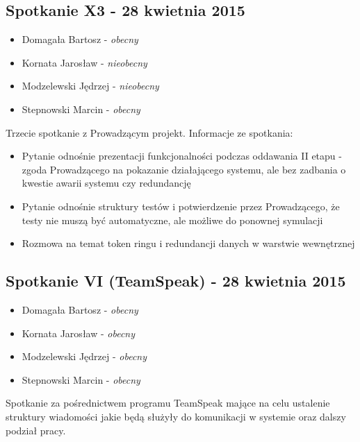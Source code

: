 \subsection[Spotkanie X3 - 28 kwietnia 2015]{Spotkanie X3 - 28 kwietnia 2015}

\begin{itemize}
\item Domagała Bartosz - \textit{obecny}
\item Kornata Jarosław - \textit{nieobecny}
\item Modzelewski Jędrzej - \textit{nieobecny}
\item Stepnowski Marcin - \textit{obecny}
\end{itemize}

\par{Trzecie spotkanie z Prowadzącym projekt. Informacje ze spotkania:}

\begin{itemize}
\item Pytanie odnośnie prezentacji funkcjonalności podczas oddawania II etapu - zgoda Prowadzącego na pokazanie działającego systemu, ale bez zadbania o kwestie awarii systemu czy redundancję
\item Pytanie odnośnie struktury testów i potwierdzenie przez Prowadzącego, że testy nie muszą być automatyczne, ale możliwe do ponownej symulacji
\item Rozmowa na temat token ringu i redundancji danych w warstwie wewnętrznej

\end{itemize}

\subsection[Spotkanie VI (TeamSpeak)- 28 kwietnia 2015]{Spotkanie VI (TeamSpeak) - 28 kwietnia 2015}

\begin{itemize}
\item Domagała Bartosz - \textit{obecny}
\item Kornata Jarosław - \textit{obecny}
\item Modzelewski Jędrzej - \textit{obecny}
\item Stepnowski Marcin - \textit{obecny}
\end{itemize}

\par{Spotkanie za pośrednictwem programu TeamSpeak mające na celu ustalenie struktury wiadomości jakie będą służyły do komunikacji w systemie oraz dalszy podział pracy.}

